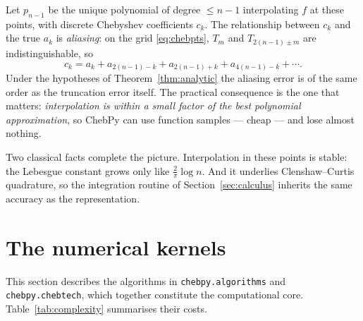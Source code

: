 \documentclass[11pt,a4paper]{article}
\newcommand{\cheb}[1]{T_{#1}}
\newcommand{\code}[1]{\texttt{#1}}
\begin{document}
Let $p_{n-1}$ be the unique polynomial of degree $\le n-1$ interpolating $f$ at
these points, with discrete Chebyshev coefficients $c_k$. The relationship
between $c_k$ and the true $a_k$ is \emph{aliasing}: on the grid
\eqref{eq:chebpts}, $\cheb{m}$ and $\cheb{2(n-1)\pm m}$ are indistinguishable,
so
\begin{equation}
  c_k = a_k + a_{2(n-1)-k} + a_{2(n-1)+k} + a_{4(n-1)-k} + \cdots .
  \label{eq:aliasing}
\end{equation}
Under the hypotheses of Theorem~\ref{thm:analytic} the aliasing error is of the
same order as the truncation error itself. The practical consequence is the one
that matters: \emph{interpolation is within a small factor of the best
polynomial approximation}, so ChebPy can use function samples --- cheap --- and
lose almost nothing.

Two classical facts complete the picture. Interpolation in these points is
stable: the Lebesgue constant grows only like $\tfrac{2}{\pi}\log n$. And it
underlies Clenshaw--Curtis quadrature, so the integration routine of
Section~\ref{sec:calculus} inherits the same accuracy as the representation.

\section{The numerical kernels}
\label{sec:algorithms}

This section describes the algorithms in \code{chebpy.algorithms} and
\code{chebpy.chebtech}, which together constitute the computational core.
Table~\ref{tab:complexity} summarises their costs.
\end{document}
